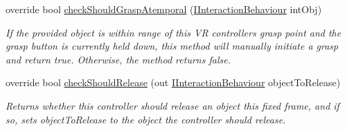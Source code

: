 \begin{DoxyCompactItemize}
override bool \mbox{\hyperlink{class_leap_1_1_unity_1_1_interaction_1_1_interaction_x_r_controller_a4756d119b4d5a13574ed990e439e64f3}{check\+Should\+Grasp\+Atemporal}} (\mbox{\hyperlink{interface_leap_1_1_unity_1_1_interaction_1_1_i_interaction_behaviour}{I\+Interaction\+Behaviour}} int\+Obj)
\begin{DoxyCompactList}\small\item\em If the provided object is within range of this VR controller\textquotesingle{}s grasp point and the grasp button is currently held down, this method will manually initiate a grasp and return true. Otherwise, the method returns false. \end{DoxyCompactList}\item 
override bool \mbox{\hyperlink{class_leap_1_1_unity_1_1_interaction_1_1_interaction_x_r_controller_a46275014cfc4325621c01097047bb701}{check\+Should\+Release}} (out \mbox{\hyperlink{interface_leap_1_1_unity_1_1_interaction_1_1_i_interaction_behaviour}{I\+Interaction\+Behaviour}} object\+To\+Release)
\begin{DoxyCompactList}\small\item\em Returns whether this controller should release an object this fixed frame, and if so, sets object\+To\+Release to the object the controller should release. \end{DoxyCompactList}\end{DoxyCompactItemize}
